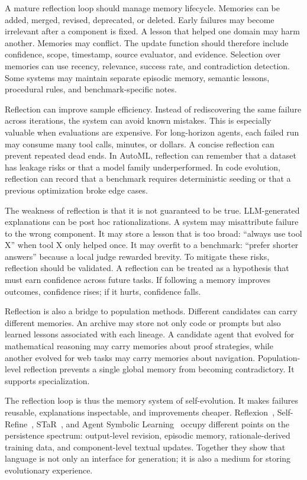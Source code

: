 A mature reflection loop should manage memory lifecycle.  Memories can be added, merged, revised, deprecated, or deleted.  Early failures may become irrelevant after a component is fixed.  A lesson that helped one domain may harm another.  Memories may conflict.  The update function should therefore include confidence, scope, timestamp, source evaluator, and evidence.  Selection over memories can use recency, relevance, success rate, and contradiction detection.  Some systems may maintain separate episodic memory, semantic lessons, procedural rules, and benchmark-specific notes.

Reflection can improve sample efficiency.  Instead of rediscovering the same failure across iterations, the system can avoid known mistakes.  This is especially valuable when evaluations are expensive.  For long-horizon agents, each failed run may consume many tool calls, minutes, or dollars.  A concise reflection can prevent repeated dead ends.  In AutoML, reflection can remember that a dataset has leakage risks or that a model family underperformed.  In code evolution, reflection can record that a benchmark requires deterministic seeding or that a previous optimization broke edge cases.

The weakness of reflection is that it is not guaranteed to be true.  LLM-generated explanations can be post hoc rationalizations.  A system may misattribute failure to the wrong component.  It may store a lesson that is too broad: ``always use tool X'' when tool X only helped once.  It may overfit to a benchmark: ``prefer shorter answers'' because a local judge rewarded brevity.  To mitigate these risks, reflection should be validated.  A reflection can be treated as a hypothesis that must earn confidence across future tasks.  If following a memory improves outcomes, confidence rises; if it hurts, confidence falls.

Reflection is also a bridge to population methods.  Different candidates can carry different memories.  An archive may store not only code or prompts but also learned lessons associated with each lineage.  A candidate agent that evolved for mathematical reasoning may carry memories about proof strategies, while another evolved for web tasks may carry memories about navigation.  Population-level reflection prevents a single global memory from becoming contradictory.  It supports specialization.

The reflection loop is thus the memory system of self-evolution.  It makes failures reusable, explanations inspectable, and improvements cheaper.  Reflexion~\cite{reflexion2023}, Self-Refine~\cite{selfrefine2023}, STaR~\cite{star2022}, and Agent Symbolic Learning~\cite{agentsymboliclearning2024} occupy different points on the persistence spectrum: output-level revision, episodic memory, rationale-derived training data, and component-level textual updates.  Together they show that language is not only an interface for generation; it is also a medium for storing evolutionary experience.

